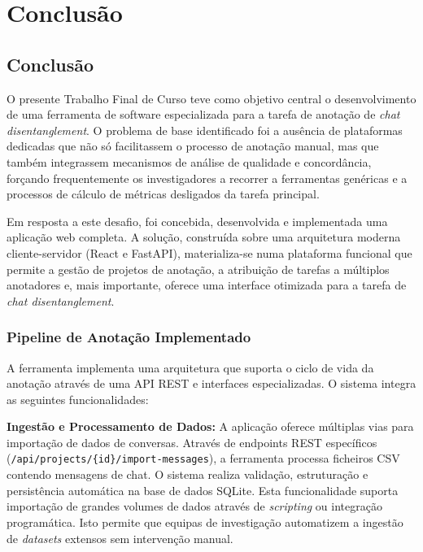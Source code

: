 \chapter{Conclusão}
\label{cha:conclusao}

\section{Conclusão}

O presente Trabalho Final de Curso teve como objetivo central o desenvolvimento de uma ferramenta de software especializada para a tarefa de anotação de \textit{chat disentanglement}. O problema de base identificado foi a ausência de plataformas dedicadas que não só facilitassem o processo de anotação manual, mas que também integrassem mecanismos de análise de qualidade e concordância, forçando frequentemente os investigadores a recorrer a ferramentas genéricas e a processos de cálculo de métricas desligados da tarefa principal.

Em resposta a este desafio, foi concebida, desenvolvida e implementada uma aplicação web completa. A solução, construída sobre uma arquitetura moderna cliente-servidor (React e FastAPI), materializa-se numa plataforma funcional que permite a gestão de projetos de anotação, a atribuição de tarefas a múltiplos anotadores e, mais importante, oferece uma interface otimizada para a tarefa de \textit{chat disentanglement}.

\subsection{Pipeline de Anotação Implementado}

A ferramenta implementa uma arquitetura que suporta o ciclo de vida da anotação através de uma API REST e interfaces especializadas. O sistema integra as seguintes funcionalidades:

\textbf{Ingestão e Processamento de Dados:} A aplicação oferece múltiplas vias para importação de dados de conversas. Através de endpoints REST específicos (\texttt{/api/projects/\{id\}/import-\linebreak messages}), a ferramenta processa ficheiros CSV contendo mensagens de chat. O sistema realiza validação, estruturação e persistência automática na base de dados SQLite. Esta funcionalidade suporta importação de grandes volumes de dados através de \textit{scripting} ou integração programática. Isto permite que equipas de investigação automatizem a ingestão de \textit{datasets} extensos sem intervenção manual.

